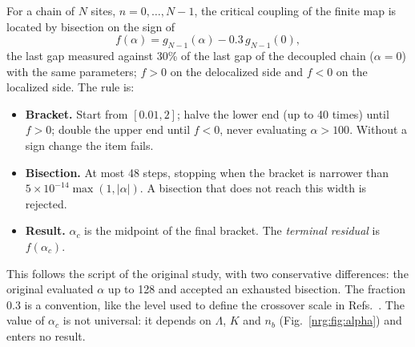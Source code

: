 For a chain of $N$ sites, $n=0,\dots,N-1$, the critical coupling of the finite map is located by bisection on the sign of
\begin{equation}
f(\alpha)=g_{N-1}(\alpha)-0.3\,g_{N-1}(0),\label{nrg:eq:bisect}
\end{equation}
the last gap measured against 30\% of the last gap of the decoupled chain ($\alpha=0$) with the same parameters; $f>0$ on the
delocalized side and $f<0$ on the localized side. The rule is:
\begin{itemize}
\item \textbf{Bracket.} Start from $[0.01,2]$; halve the lower end (up to 40 times) until $f>0$; double the upper end until $f<0$,
  never evaluating $\alpha>100$. Without a sign change the item fails.
\item \textbf{Bisection.} At most 48 steps, stopping when the bracket is narrower than $5\times10^{-14}\max(1,|\alpha|)$. A bisection
  that does not reach this width is rejected.
\item \textbf{Result.} $\alpha_c$ is the midpoint of the final bracket. The \emph{terminal residual} is $f(\alpha_c)$.
\end{itemize}
This follows the script of the original study, with two conservative differences: the original evaluated $\alpha$ up to 128 and
accepted an exhausted bisection. The fraction 0.3 is a convention, like the level used to define the crossover
scale in Refs.~\cite{nrg:Bulla2003,nrg:Bulla2005}. The value of $\alpha_c$ is not universal: it depends on $\Lambda$, $K$ and $n_b$
(Fig.~\ref{nrg:fig:alpha}) and enters no result.

